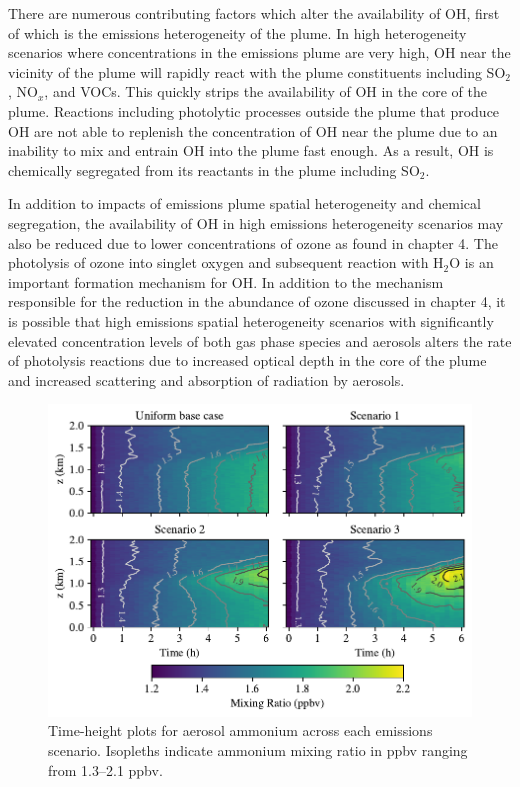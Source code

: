 There are numerous contributing factors which alter the availability of OH, first of which is the emissions heterogeneity of the plume. In high heterogeneity scenarios where concentrations in the emissions plume are very high, OH near the vicinity of the plume will rapidly react with the plume constituents including SO$_2$, NO$_x$, and VOCs. This quickly strips the availability of OH in the core of the plume. Reactions including photolytic processes outside the plume that produce OH are not able to replenish the concentration of OH near the plume due to an inability to mix and entrain OH into the plume fast enough. As a result, OH is chemically segregated from its reactants in the plume including SO$_2$. 

In addition to impacts of emissions plume spatial heterogeneity and chemical segregation, the availability of OH in high emissions heterogeneity scenarios may also be reduced due to lower concentrations of ozone as found in chapter 4. The photolysis of ozone into singlet oxygen and subsequent reaction with H$_2$O is an important formation mechanism for OH. In addition to the mechanism responsible for the reduction in the abundance of ozone discussed in chapter 4, it is possible that high emissions spatial heterogeneity scenarios with   significantly elevated concentration levels of both gas phase species and aerosols alters the rate of photolysis reactions due to increased optical depth in the core of the plume and  increased scattering and absorption of radiation by aerosols. 

\begin{figure}[!t]
  \centering
    \includegraphics[width=\textwidth]{figures/chapter5/height-time-pmc_NH4-four-scenarios.pdf}
    \caption{Time-height plots for aerosol ammonium across each emissions scenario. Isopleths indicate ammonium mixing ratio in ppbv ranging from 1.3--2.1 ppbv.}
    \label{fig:ht-nh4}
\end{figure}

